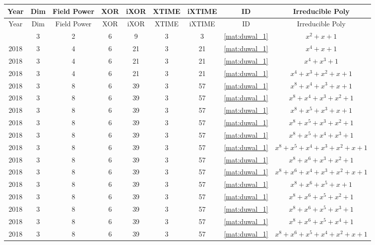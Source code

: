 \begin{longtable}{|c|c|c|c|c|c|c|c|c|}
\hline
Year & Dim & Field Power & XOR & iXOR & XTIME & iXTIME & ID & Irreducible Poly \\
\hline
\endfirsthead
\hline
Year & Dim & Field Power & XOR & iXOR & XTIME & iXTIME & ID & Irreducible Poly \\
\hline
\endhead
\hline
\endfoot
2018 & 3 & 2 & 6 & 9 & 3 & 3 & \eqref{mat:duwal_1} & $x^2 + x + 1$ \\ \hline 
2018 & 3 & 4 & 6 & 21 & 3 & 21 & \eqref{mat:duwal_1} & $x^4 + x + 1$ \\ \hline 
2018 & 3 & 4 & 6 & 21 & 3 & 21 & \eqref{mat:duwal_1} & $x^4 + x^3 + 1$ \\ \hline 
2018 & 3 & 4 & 6 & 21 & 3 & 21 & \eqref{mat:duwal_1} & $x^4 + x^3 + x^2 + x + 1$ \\ \hline 
2018 & 3 & 8 & 6 & 39 & 3 & 57 & \eqref{mat:duwal_1} & $x^8 + x^4 + x^3 + x + 1$ \\ \hline 
2018 & 3 & 8 & 6 & 39 & 3 & 57 & \eqref{mat:duwal_1} & $x^8 + x^4 + x^3 + x^2 + 1$ \\ \hline 
2018 & 3 & 8 & 6 & 39 & 3 & 57 & \eqref{mat:duwal_1} & $x^8 + x^5 + x^3 + x + 1$ \\ \hline 
2018 & 3 & 8 & 6 & 39 & 3 & 57 & \eqref{mat:duwal_1} & $x^8 + x^5 + x^3 + x^2 + 1$ \\ \hline 
2018 & 3 & 8 & 6 & 39 & 3 & 57 & \eqref{mat:duwal_1} & $x^8 + x^5 + x^4 + x^3 + 1$ \\ \hline 
2018 & 3 & 8 & 6 & 39 & 3 & 57 & \eqref{mat:duwal_1} & $x^8 + x^5 + x^4 + x^3 + x^2 + x + 1$ \\ \hline 
2018 & 3 & 8 & 6 & 39 & 3 & 57 & \eqref{mat:duwal_1} & $x^8 + x^6 + x^3 + x^2 + 1$ \\ \hline 
2018 & 3 & 8 & 6 & 39 & 3 & 57 & \eqref{mat:duwal_1} & $x^8 + x^6 + x^4 + x^3 + x^2 + x + 1$ \\ \hline 
2018 & 3 & 8 & 6 & 39 & 3 & 57 & \eqref{mat:duwal_1} & $x^8 + x^6 + x^5 + x + 1$ \\ \hline 
2018 & 3 & 8 & 6 & 39 & 3 & 57 & \eqref{mat:duwal_1} & $x^8 + x^6 + x^5 + x^2 + 1$ \\ \hline 
2018 & 3 & 8 & 6 & 39 & 3 & 57 & \eqref{mat:duwal_1} & $x^8 + x^6 + x^5 + x^3 + 1$ \\ \hline 
2018 & 3 & 8 & 6 & 39 & 3 & 57 & \eqref{mat:duwal_1} & $x^8 + x^6 + x^5 + x^4 + 1$ \\ \hline 
2018 & 3 & 8 & 6 & 39 & 3 & 57 & \eqref{mat:duwal_1} & $x^8 + x^6 + x^5 + x^4 + x^2 + x + 1$ \\ \hline 

\end{longtable}

